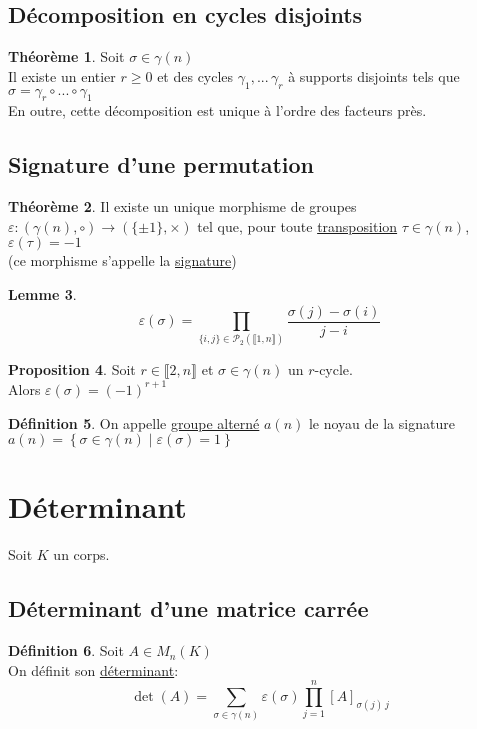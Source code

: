 \documentclass[10pt,a4paper]{article}
\theoremstyle{definition}
\newtheorem{proposition}{Proposition}[section]
\newtheorem{theorem}[proposition]{Théorème}
\newtheorem{lemme}[proposition]{Lemme}
\newtheorem{definition}[proposition]{Définition}
\begin{document}
\subsection{Décomposition en cycles disjoints}
\begin{theorem}
Soit $\sigma \in \gamma(n)$ \\
Il existe un entier $r \geq 0$ et des cycles $\gamma_1, ...\, \gamma_r$ à supports disjoints tels que $\sigma = \gamma_r \circ ... \circ \gamma_1$ \\
En outre, cette décomposition est unique à l'ordre des facteurs près.
\end{theorem}

\subsection{Signature d'une permutation}
\begin{theorem}
Il existe un unique morphisme de groupes $\varepsilon: (\gamma(n), \circ) \to (\{ \pm 1 \}, \times)$ tel que, pour toute \uline{transposition} $\tau \in \gamma(n)$, $\varepsilon(\tau) = -1$ \\
(ce morphisme s'appelle la \uline{signature})
\end{theorem}
\begin{lemme}
\[\varepsilon(\sigma) = \prod_{\{i, j\} \in \mathcal{P}_2(\llbracket 1, n \rrbracket)} \frac{\sigma(j) - \sigma(i)}{j - i}\]
\end{lemme}
\begin{proposition}
Soit $r \in \llbracket 2, n \rrbracket$ et $\sigma \in \gamma(n)$ un $r$-cycle. \\
Alors $\varepsilon(\sigma) = (-1)^{r + 1}$
\end{proposition}
\begin{definition}
On appelle \uline{groupe alterné} $a(n)$ le noyau de la signature $a(n) = \left\{ \sigma \in \gamma(n) \mid \varepsilon(\sigma) = 1 \right\}$
\end{definition}

\pagebreak

\section{Déterminant}
Soit $K$ un corps.
\subsection{Déterminant d'une matrice carrée}
\begin{definition}
Soit $A \in M_n(K)$ \\
On définit son \uline{déterminant}:
\[ \det(A) = \sum_{\sigma \in \gamma(n)} \varepsilon(\sigma) \prod_{j = 1}^n [A]_{\sigma(j) \, j}\]
\end{definition}
\end{document}
